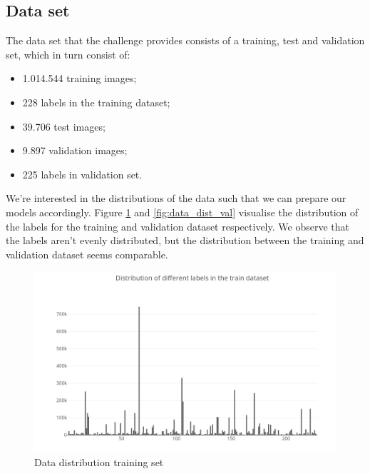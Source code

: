 \documentclass[10pt, a4paper]{article}
\begin{document}
\begin{multicols}{2}
		\section{Data set}
        The data set that the challenge provides consists of a training, test and validation set, which in turn consist of: 
        \begin{itemize}
            \item 1.014.544 training images;
            \item 228 labels in the training dataset;
            \item 39.706 test images;
            \item 9.897 validation images;
            \item 225 labels in validation set.
        \end{itemize}
        We're interested in the distributions of the data such that we can prepare our models accordingly. Figure \ref{fig:data_dist_train} and \ref{fig:data_dist_val} visualise the distribution of the labels for the training and validation dataset respectively. We observe that the labels aren't evenly distributed, but the distribution between the training and validation dataset seems comparable.
        \begin{figure}[H]
            \centering
            \includegraphics[scale=.4]{img/dist_labels_train.PNG}
            \caption{Data distribution training set}
            \label{fig:data_dist_train}
        \end{figure}
        

\end{multicols}
\end{document}
